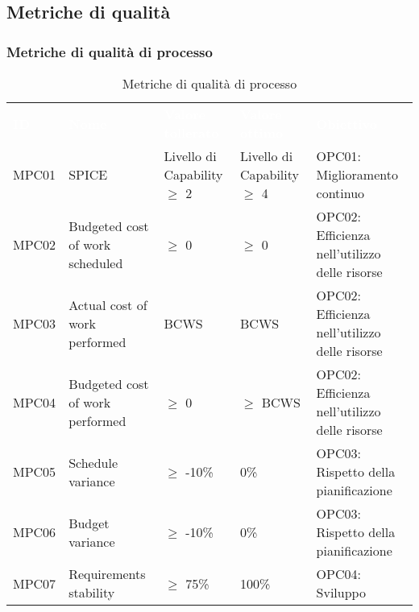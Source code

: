 \subsection{Metriche di qualità}

\subsubsection{Metriche di qualità di processo}

\begin{table}[H]
    \renewcommand{\arraystretch}{1.5}
    \begin{tabular}{ m{}<{\centering}  m{}<{\centering}  m{}<{\centering}  m{}<{\centering} m{}<{\centering}}
        \rowcolor{darkblue}
        \textcolor{white}{\textbf{ID}} &\textcolor{white}{\textbf{Nome}}& \textcolor{white}{\textbf{Valore tollerato}} & \textcolor{white}{\textbf{Valore ottimo}} & \textcolor{white}{\textbf{Obiettivo}}\\ 
        
        MPC01 &
        SPICE &
        Livello di Capability $\geq$ 2 &
        Livello di Capability $\geq$ 4 &
        OPC01: Miglioramento continuo \\

        \rowcolor{gray!25}
        MPC02 &
        Budgeted cost of work scheduled &
        $\geq$ 0 &
        $\geq$ 0 &
        OPC02: Efficienza nell’utilizzo delle risorse \\

        MPC03 &
        Actual cost of work performed &
        BCWS &
        BCWS &
        OPC02: Efficienza nell’utilizzo delle risorse\\

        \rowcolor{gray!25}
        MPC04 &
        Budgeted cost of work performed &
        $\geq$ 0 &
        $\geq$ BCWS &
        OPC02: Efficienza nell’utilizzo delle risorse \\

        MPC05 &
        Schedule variance &
        $\geq$ -10\% &
        0\% &
        OPC03: Rispetto della pianificazione \\

        \rowcolor{gray!25}
        MPC06 &
        Budget variance &
        $\geq$ -10\% &
        0\% &
        OPC03: Rispetto della pianificazione \\

        MPC07 &
        Requirements stability &
        $\geq$ 75\% &
        100\% &
        OPC04: Sviluppo \\



    \end{tabular}
    \caption{Metriche di qualità di processo}
\end{table}

